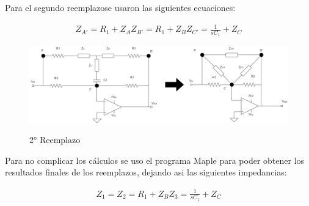 Para el segundo reemplazose usaron las siguientes ecuaciones:

\begin{align}

	\begin{equation}
		Z_{A'}= R_1 + Z_{A}
	\end{equation}

	\begin{equation}
		Z_{B'}= R_1 + Z_{B}
	\end{equation}
	
	\begin{equation}
		Z_{C'}= \frac{1}{sC_1} + Z_{C}
	\end{equation}

\end{align}

\begin{figure}[h]
	\caption{2° Reemplazo}
	\centering
	\includegraphics[scale=0.6]{Informe/2cambioTriangulo.png}
	\label{2reemplazo} 
\end{figure}


Para no complicar los cálculos se uso el programa Maple para poder obtener los resultados finales de los reemplazos, dejando asi las siguientes impedancias:

\begin{align}

	\begin{equation}
		Z_{1}= 
	\end{equation}

	\begin{equation}
		Z_{2}= R_1 + Z_{B}
	\end{equation}
	
	\begin{equation}
		Z_{3}= \frac{1}{sC_1} + Z_{C}
	\end{equation}

\end{align}




